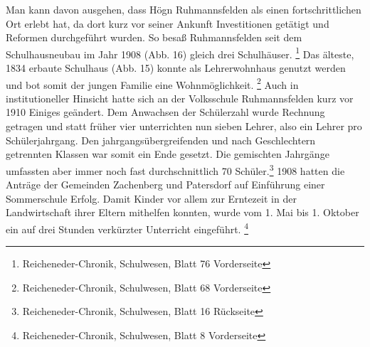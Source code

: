 Man kann davon ausgehen, dass Högn Ruhmannsfelden als einen
fortschrittlichen Ort erlebt hat, da dort kurz vor seiner Ankunft
Investitionen getätigt und Reformen durchgeführt wurden. So besaß
Ruhmannsfelden seit dem Schulhausneubau im Jahr 1908 (Abb. 16) gleich
drei Schulhäuser. \footnote{Reicheneder-Chronik, Schulwesen, Blatt 76
Vorderseite} Das älteste, 1834 erbaute Schulhaus (Abb. 15) konnte als
Lehrerwohnhaus genutzt werden und bot somit der jungen Familie eine
Wohnmöglichkeit. \footnote{Reicheneder-Chronik, Schulwesen, Blatt 68
Vorderseite} Auch in institutioneller Hinsicht hatte sich an der
Volksschule Ruhmannsfelden kurz vor 1910 Einiges geändert. Dem
Anwachsen der Schülerzahl wurde Rechnung getragen und statt früher vier
unterrichten nun sieben Lehrer, also ein Lehrer pro Schülerjahrgang.
Den jahrgangsübergreifenden und nach Geschlechtern getrennten Klassen
war somit ein Ende gesetzt. Die gemischten Jahrgänge umfassten aber
immer noch fast durchschnittlich 70 Schüler.\footnote{
Reicheneder-Chronik, Schulwesen, Blatt 16 Rückseite} 1908 hatten die
Anträge der Gemeinden Zachenberg und Patersdorf auf Einführung einer
Sommerschule Erfolg. Damit Kinder vor allem zur Erntezeit in der
Landwirtschaft ihrer Eltern mithelfen konnten, wurde vom 1. Mai bis 1.
Oktober ein auf drei Stunden verkürzter Unterricht
eingeführt. \footnote{Reicheneder-Chronik, Schulwesen, Blatt 8
Vorderseite}

